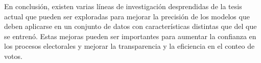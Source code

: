 En conclusión, existen varias líneas de investigación desprendidas de la tesis actual que pueden ser exploradas para
mejorar la precisión de los modelos que deben aplicarse en un conjunto de datos con características distintas que del
que se entrenó. Estas mejoras pueden ser importantes para aumentar la confianza en los procesos electorales y mejorar
la transparencia y la eficiencia en el conteo de votos.